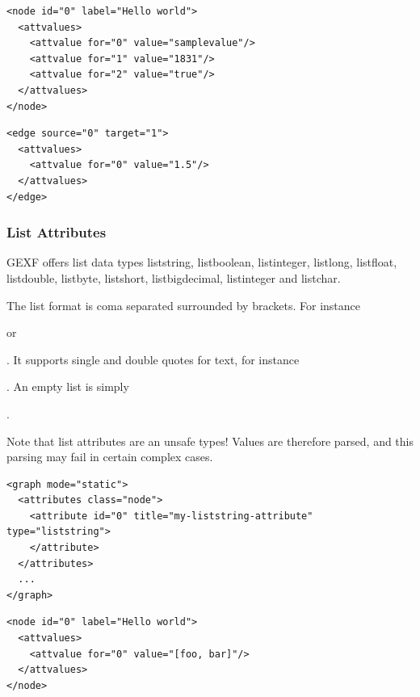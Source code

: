 \documentclass[a4paper,10pt]{article}
\begin{document}
\lstset{ style=gexf }
\begin{lstlisting}[caption={Node Attributes},label=nodeattributes]
<node id="0" label="Hello world">
  <attvalues>
    <attvalue for="0" value="samplevalue"/>
    <attvalue for="1" value="1831"/>
    <attvalue for="2" value="true"/>
  </attvalues>
</node>
\end{lstlisting}

\lstset{ style=gexf }
\begin{lstlisting}[caption={Edge Attributes},label=edgeattributes]
<edge source="0" target="1">
  <attvalues>
    <attvalue for="0" value="1.5"/>
  </attvalues>
</edge>
\end{lstlisting}

\subsubsection{List Attributes}

GEXF offers list data types liststring, listboolean, listinteger, listlong, listfloat, listdouble, listbyte, listshort, listbigdecimal, listinteger and listchar.

The list format is coma separated surrounded by brackets. For instance \begin{footnotesize}[1, 2, 3]\end{footnotesize} or \begin{footnotesize}\end{footnotesize}. It supports single and double quotes for text, for instance \begin{footnotesize}\end{footnotesize}. An empty list is simply \begin{footnotesize}[]\end{footnotesize}.

Note that list attributes are an unsafe types! Values are therefore parsed, and this parsing may fail in certain complex cases.

\lstset{ style=gexf }
\begin{lstlisting}[caption={Liststring Definition},label=liststringDef]
<graph mode="static">
  <attributes class="node">
    <attribute id="0" title="my-liststring-attribute" type="liststring">
    </attribute>
  </attributes>
  ...
</graph>
\end{lstlisting}

\lstset{ style=gexf }
\begin{lstlisting}[caption={Liststring usage},label=liststringUse]
<node id="0" label="Hello world">
  <attvalues>
    <attvalue for="0" value="[foo, bar]"/>
  </attvalues>
</node>
\end{lstlisting}
\end{document}
